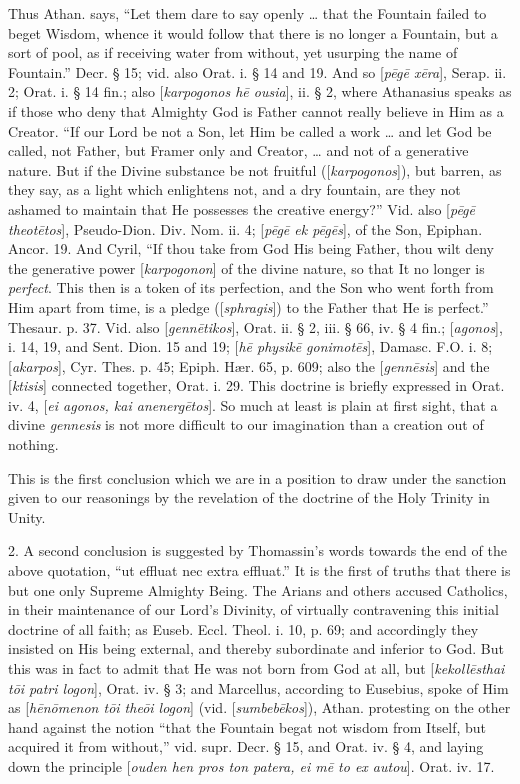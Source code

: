 Thus Athan. says, ``Let them dare to say openly
… that the Fountain failed to beget Wisdom, whence it would follow
that there is no longer a Fountain, but a sort of pool, as if
receiving water from without, yet usurping the name of Fountain.'' Decr.
§ 15; vid. also Orat. i. § 14 and 19. And so [\emph{p\={e}g\={e} x\={e}ra}], Serap. ii. 2; Orat. i. § 14 fin.; also [\emph{karpogonos h\={e}
ousia}], ii. § 2, where Athanasius speaks as if those who deny
that Almighty God is Father cannot really believe in Him as a Creator.
``If our Lord be not a Son, let Him be called a work … and let God be
called, not Father, but Framer only and Creator, … and not of a
generative nature. But if the Divine substance be not fruitful
([\emph{karpogonos}]), but barren, as they say, as a light which enlightens not, and
a dry fountain, are they not ashamed to maintain that He possesses the
creative energy?'' Vid. also [\emph{p\={e}g\={e} theot\={e}tos}],
Pseudo-Dion. Div. Nom. ii. 4; [\emph{p\={e}g\={e} ek p\={e}g\={e}s}],
of the Son, Epiphan. Ancor. 19. And Cyril, ``If thou take from God His
being Father, thou wilt deny the generative power
[\emph{karpogonon}]
of the divine nature, so that It no longer is \emph{perfect}.
This then is a token of its perfection, and the Son who went forth
from Him apart from time, is a pledge ([\emph{sphragis}]) to the Father that He is perfect.'' Thesaur. p. 37. Vid. also [\emph{genn\={e}tikos}], Orat. ii. § 2, iii. § 66, iv. § 4 fin.; [\emph{agonos}], i. 14, 19, and
Sent. Dion. 15 and 19; [\emph{h\={e}
physik\={e} gonimot\={e}s}],
Damasc. F.O. i. 8; [\emph{akarpos}],
Cyr. Thes. p. 45; Epiph. Hær. 65, p. 609; also the [\emph{genn\={e}sis}]
and the [\emph{ktisis}] connected together,
Orat. i. 29. This doctrine is briefly expressed in Orat.
iv. 4, [\emph{ei agonos, kai anenerg\={e}tos}].
So much at least is plain at first sight, that a divine \emph{gennesis} is not more difficult to our imagination than a creation
out of nothing.

This is the first conclusion which we are in a
position to draw under the sanction given to our reasonings by the
revelation of the doctrine of the Holy Trinity in Unity.

2. A second conclusion is suggested by Thomassin's
words towards the end of the above quotation, ``ut effluat nec extra
effluat.'' It is the first of truths that there is but one only Supreme
Almighty Being. The Arians and others accused Catholics, in their
maintenance of our Lord's Divinity, of virtually contravening this
initial doctrine of all faith; as Euseb. Eccl. Theol. i. 10, p. 69; and
accordingly they insisted on His being external, and thereby
subordinate and inferior to God. But this was in fact to admit that He
was not born from God at all, but [\emph{kekoll\={e}sthai t\={o}i
patri logon}], Orat. iv. § 3; and Marcellus, according to
Eusebius, spoke of Him as [\emph{h\={e}n\={o}menon t\={o}i the\={o}i
logon}] (vid. [\emph{sumbeb\={e}kos}]), Athan. protesting on the
other hand against the notion ``that the Fountain begat not wisdom from
Itself, but acquired it from without,'' vid. supr. Decr. § 15, and
Orat. iv. § 4, and laying down the principle [\emph{ouden hen pros ton
patera, ei m\={e} to ex autou}]. Orat. iv. 17.

